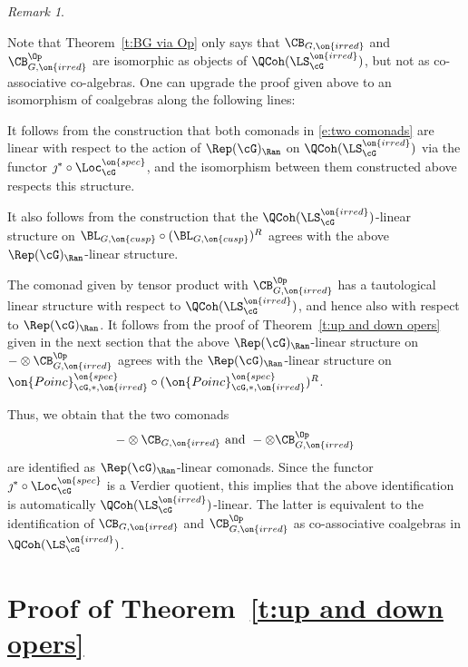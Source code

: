 \documentclass[9pt]{amsart}
\theoremstyle{remark}
\newtheorem{rem}[subsubsection]{Remark}
\theoremstyle{definition}
\theoremstyle{remark}
\newcommand{\thmref}[1]{Theorem~\ref{#1}}
\numberwithin{equation}{section}
\begin{document}
\begin{rem} \label{r:coalg}

Note that \thmref{t:BG via Op} only says that $\CB_{G,\on{irred}}$ and $\CB^{\Op}_{G,\on{irred}}$ are isomorphic 
as objects of $\QCoh(\LS^{\on{irred}}_\cG)$, but not as co-associative co-algebras. One can upgrade the proof
given above to an isomorphism of coalgebras along the following lines:

\medskip

It follows from the construction that both comonads in \eqref{e:two comonads} are linear with respect to
the action of $\Rep(\cG)_\Ran$ on $\QCoh(\LS^{\on{irred}}_\cG)$ via the functor $\jmath^*\circ \Loc^{\on{spec}}_\cG$, and the
isomorphism between them constructed above respects this structure.

\medskip

It also follows from the construction that the $\QCoh(\LS^{\on{irred}}_\cG)$-linear structure on 
$\BL_{G,\on{cusp}}\circ (\BL_{G,\on{cusp}})^R$ agrees with the above $\Rep(\cG)_\Ran$-linear structure. 

\medskip

The comonad given by tensor product with $\CB^{\Op}_{G,\on{irred}}$ has a tautological linear structure with respect to
$\QCoh(\LS^{\on{irred}}_\cG)$, and hence also with respect to $\Rep(\cG)_\Ran$. It follows from the proof 
of \thmref{t:up and down opers} given in the next section that the above $\Rep(\cG)_\Ran$-linear structure on $-\otimes \CB^{\Op}_{G,\on{irred}}$ 
agrees with the $\Rep(\cG)_\Ran$-linear structure on $\on{Poinc}^{\on{spec}}_{\cG,*,\on{irred}} \circ (\on{Poinc}^{\on{spec}}_{\cG,*,\on{irred}})^R$.

\medskip

Thus, we obtain that the two comonads
$$-\otimes \CB_{G,\on{irred}} \text{ and } -\otimes \CB^{\Op}_{G,\on{irred}}$$
are identified as $\Rep(\cG)_\Ran$-linear comonads. Since the functor $\jmath^*\circ \Loc^{\on{spec}}_\cG$ is a Verdier quotient,
this implies that the above identification is automatically $\QCoh(\LS^{\on{irred}}_\cG)$-linear. The latter is equivalent to the 
identification of $\CB_{G,\on{irred}}$ and $\CB^{\Op}_{G,\on{irred}}$ as co-associative coalgebras in $\QCoh(\LS^{\on{irred}}_\cG)$.


\end{rem} 

\section{Proof of \thmref{t:up and down opers}} \label{s:proof up and down}
\end{document}
